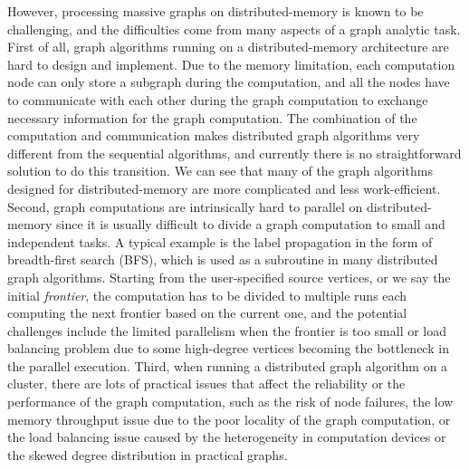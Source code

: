 \documentclass{sokendai_thesis} %
\begin{document}
However, processing massive graphs on distributed-memory is known to be challenging, and the difficulties come from many aspects of a graph analytic task.
First of all, graph algorithms running on a distributed-memory architecture are hard to design and implement.
Due to the memory limitation, each computation node can only store a subgraph during the computation, and all the nodes have to communicate with each other during the graph computation to exchange necessary information for the graph computation.
The combination of the computation and communication makes distributed graph algorithms very different from the sequential algorithms, and currently there is no straightforward solution to do this transition.
We can see that many of the graph algorithms designed for distributed-memory are more complicated and less work-efficient.
Second, graph computations are intrinsically hard to parallel on distributed-memory since it is usually difficult to divide a graph computation to small and independent tasks.
A typical example is the label propagation in the form of breadth-first search (BFS), which is used as a subroutine in many distributed graph algorithms.
Starting from the user-specified source vertices, or we say the initial \emph{frontier}, the computation has to be divided to multiple runs each computing the next frontier based on the current one, and the potential challenges include the limited parallelism when the frontier is too small or load balancing problem due to some high-degree vertices becoming the bottleneck in the parallel execution.
Third, when running a distributed graph algorithm on a cluster, there are lots of practical issues that affect the reliability or the performance of the graph computation, such as the risk of node failures, the low memory throughput issue due to the poor locality of the graph computation, or the load balancing issue caused by the heterogeneity in computation devices or the skewed degree distribution in practical graphs.
\end{document}
